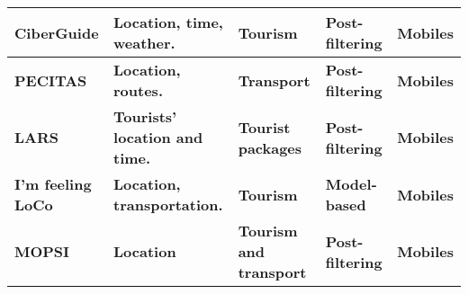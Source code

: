 \begin{sidewaystable}[]
\begin{tabular}{p{3.5cm} p{6cm} p{4cm} p{3cm} p{3cm} }
            \textbf{CiberGuide} & \textbf{Location, time, weather.} & \textbf{Tourism} & \textbf{Post-filtering} & \textbf{Mobiles} \\ \hline

            \textbf{PECITAS} & \textbf{Location, routes.} & \textbf{Transport} & \textbf{Post-filtering} & \textbf{Mobiles} \\ \hline

            \textbf{LARS} & \textbf{Tourists’ location and time.} & \textbf{Tourist packages} & \textbf{Post-filtering} & \textbf{Mobiles} \\ \hline

            \textbf{I'm feeling LoCo} & \textbf{Location, transportation.} & \textbf{Tourism} & \textbf{Model-based} & \textbf{Mobiles} \\ \hline

            \textbf{MOPSI} & \textbf{Location} & \textbf{Tourism and transport} & \textbf{Post-filtering} & \textbf{Mobiles} \\ \hline

           \bottomrule
        \end{tabular}\hspace*{-1cm}
\end{sidewaystable}








